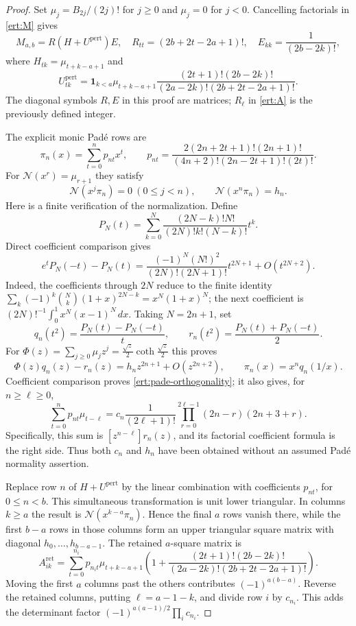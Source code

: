 \begin{proof}
Set $\mu_j=B_{2j}/(2j)!$ for $j\ge0$ and $\mu_j=0$ for $j<0$.
Cancelling factorials in \eqref{ert:M} gives
\[
 M_{a,b}=R(H+U^{\mathrm{pert}})E,
 \quad R_{tt}=(2b+2t-2a+1)!,\quad E_{kk}=\frac1{(2b-2k)!},
\]
where $H_{tk}=\mu_{t+k-a+1}$ and
\[
 U^{\mathrm{pert}}_{tk}=\mathbf1_{k<a}\mu_{t+k-a+1}
 \frac{(2t+1)!(2b-2k)!}
 {(2a-2k)!(2b+2t-2a+1)!}.
\]
The diagonal symbols $R,E$ in this proof are matrices; $R_\ell$
in \eqref{ert:A} is the previously defined integer.

The explicit monic Pad\'e rows are
\[
 \pi_n(x)=\sum_{t=0}^np_{nt}x^t,\qquad
 p_{nt}=\frac{2(2n+2t+1)!(2n+1)!}
 {(4n+2)!(2n-2t+1)!(2t)!}.
\]
For $\mathcal N(x^r)=\mu_{r+1}$ they satisfy
\begin{equation}\label{ert:pade-orthogonality}
 \mathcal N(x^j\pi_n)=0\ (0\le j<n),\qquad
 \mathcal N(x^n\pi_n)=h_n.
\end{equation}
Here is a finite verification of the normalization. Define
\[
 P_N(t)=\sum_{k=0}^N
 \frac{(2N-k)!N!}{(2N)!k!(N-k)!}t^k.
\]
Direct coefficient comparison gives
\[
 e^tP_N(-t)-P_N(t)
 =\frac{(-1)^N(N!)^2}{(2N)!(2N+1)!}t^{2N+1}
       +O(t^{2N+2}).
\]
Indeed, the coefficients through $2N$ reduce to the finite identity
$\sum_k(-1)^k\binom Nk(1+x)^{2N-k}=x^N(1+x)^N$;
the next coefficient is
$(2N)!^{-1}\int_0^1x^N(x-1)^N\,dx$.
Taking $N=2n+1$, set
\[
 q_n(t^2)=\frac{P_N(t)-P_N(-t)}t,\qquad
 r_n(t^2)=\frac{P_N(t)+P_N(-t)}2.
\]
For $\Phi(z)=\sum_{j\ge0}\mu_jz^j
=\frac{\sqrt z}{2}\coth\frac{\sqrt z}{2}$ this proves
\[
 \Phi(z)q_n(z)-r_n(z)=h_nz^{2n+1}+O(z^{2n+2}),
 \qquad \pi_n(x)=x^nq_n(1/x).
\]
Coefficient comparison proves \eqref{ert:pade-orthogonality};
it also gives, for $n\ge\ell\ge0$,
\begin{equation}\label{ert:constant-pade-row}
 \sum_{t=0}^np_{nt}\mu_{t-\ell}=c_n
 \frac1{(2\ell+1)!}
 \prod_{r=0}^{2\ell-1}(2n-r)(2n+3+r).
\end{equation}
Specifically, this sum is $[z^{n-\ell}]r_n(z)$, and its
factorial coefficient formula is the right side. Thus both
$c_n$ and $h_n$ have been obtained without an assumed Pad\'e
normality assertion.

Replace row $n$ of $H+U^{\mathrm{pert}}$ by the linear combination
with coefficients $p_{nt}$, for $0\le n<b$. This simultaneous
transformation is unit lower triangular. In columns $k\ge a$ the
result is $\mathcal N(x^{k-a}\pi_n)$. Hence the final $a$ rows
vanish there, while the first $b-a$ rows in those columns form an
upper triangular square matrix with diagonal
$h_0,\ldots,h_{b-a-1}$. The retained $a$-square matrix is
\[
 A^{\mathrm{ret}}_{ik}=
 \sum_{t=0}^{n_i}p_{n_it}\mu_{t+k-a+1}
 \left(1+\frac{(2t+1)!(2b-2k)!}
 {(2a-2k)!(2b+2t-2a+1)!}\right).
\]
Moving the first $a$ columns past the others contributes
$(-1)^{a(b-a)}$. Reverse the retained columns, putting
$\ell=a-1-k$, and divide row $i$ by $c_{n_i}$.
This adds the determinant factor
$(-1)^{a(a-1)/2}\prod_i c_{n_i}$.


\end{proof}
